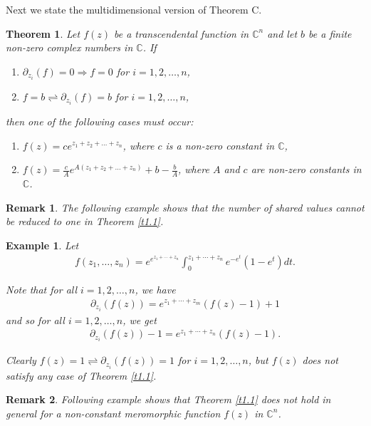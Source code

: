 \documentclass[11pt, reqno]{amsart}
\newtheorem*{cor A}{Corollary A}
\newtheorem*{cor B}{Corollary B}
\newtheorem{theo}{Theorem}[section]
\newtheorem{exm}{Example}[section]
\newtheorem{rem}{Remark}[section]
\numberwithin{equation}{section}
\begin{document}
Next we state the multidimensional version of Theorem C.
\begin{theo}\label{t1.3} Let $f(z)$ be a transcendental function in $\mathbb{C}^n$ and let $b$ be a finite non-zero complex numbers in $\mathbb{C}$. If 
\begin{enumerate}
\item[(i)] $\partial_{z_i}(f)=0\Rightarrow f=0$ for $i=1,2,\ldots,n$,
\item[(ii)] $f=b\rightleftharpoons \partial_{z_i}(f)=b$ for $i=1,2,\ldots,n$, 
\end{enumerate}
then one of the following cases must occur:
\begin{enumerate} 
\item[(1)] $f(z)=ce^{z_1+z_2+\ldots+z_n}$, where $c$ is a non-zero constant in $\mathbb{C}$, 
\item[(2)] $f(z)=\frac{c}{A}e^{A(z_1+z_2+\ldots+z_n)}+b-\frac{b}{A}$, where $A$ and $c$ are non-zero constants in $\mathbb{C}$.
\end{enumerate}
\end{theo}

\begin{rem} The following example shows that the number of shared values cannot be reduced to one in Theorem \ref{t1.1}.
\end{rem}

\begin{exm} Let 
\begin{align*}
f(z_1,\ldots,z_n)=e^{e^{z_1+\cdots+z_n}}\int_{0}^{z_1+\cdots+z_n}e^{-e^t}(1-e^t)dt.
\end{align*}

Note that for all $i=1,2,\ldots,n$, we have
\begin{align*}
\partial_{z_i}(f(z))=e^{z_1+\cdots+z_m}(f(z)-1)+1
\end{align*}
and so for all $i=1,2,\ldots,n$, we get
\begin{align*}
\partial_{z_i}(f(z))-1=e^{z_1+\cdots+z_n}(f(z)-1).
\end{align*}

Clearly $f(z)=1 \rightleftharpoons \partial_{z_i}(f(z))=1$ for $i=1,2,\ldots,n$, but $f(z)$ does not satisfy any case of Theorem \ref{t1.1}.
\end{exm}

\begin{rem}
Following example shows that \textrm{Theorem \ref{t1.1}} does not hold in general for a non-constant meromorphic function $f(z)$ in $\mathbb{C}^n$.
\end{rem}
\end{document}
